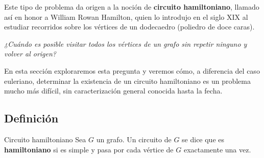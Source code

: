 Este tipo de problema da origen a la noción de \textbf{circuito hamiltoniano}, llamado así en honor a William Rowan Hamilton, quien lo introdujo en el siglo XIX al estudiar recorridos sobre los vértices de un dodecaedro (poliedro de doce caras).

\begin{center}
\textit{¿Cuándo es posible visitar todos los vértices de un grafo sin repetir ninguno y volver al origen?}
\end{center}

\medskip

En esta sección exploraremos esta pregunta y veremos cómo, a diferencia del caso euleriano, determinar la existencia de un circuito hamiltoniano es un problema mucho más difícil, sin caracterización general conocida hasta la fecha.



\subsection{Definición}

\begin{definitionblock}{Circuito hamiltoniano}
Sea \( G \) un grafo. Un circuito de \( G \) se dice que es \textbf{hamiltoniano} si es simple y pasa por cada vértice de \( G \) exactamente una vez.
\end{definitionblock}


